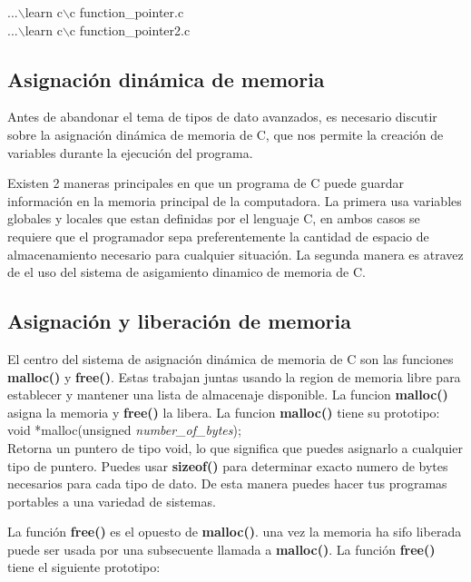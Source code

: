 \documentclass[]{article}
\begin{document}
	...$\backslash$learn c$\backslash$c function\_pointer.c\\
	
	...$\backslash$learn c$\backslash$c function\_pointer2.c\\
	
	\subsection{Asignación dinámica de memoria}
	
	Antes de abandonar el tema de tipos de dato avanzados, es necesario discutir sobre la asignación dinámica de memoria de C, que nos permite la creación de variables durante la ejecución del programa.
	
	Existen 2 maneras principales en que un programa de C puede guardar información en la memoria principal de la computadora. La primera usa variables globales y locales que estan definidas por el lenguaje C, en ambos casos se requiere que el programador sepa preferentemente la cantidad de espacio de almacenamiento necesario para cualquier situación. La segunda manera es atravez de el uso del sistema de asigamiento dinamico de memoria de C.\\
	
	\subsection{Asignación y liberación de memoria}
	
	El centro del sistema de asignación dinámica de memoria de C son las funciones \textbf{malloc()} y \textbf{free()}. Estas trabajan juntas usando la region de memoria libre para establecer y mantener una lista de almacenaje disponible. La funcion \textbf{malloc()} asigna la memoria y \textbf{free()} la libera. La funcion \textbf{malloc()} tiene su prototipo:\\
	
	void *malloc(unsigned \textit{number\_of\_bytes});\\
	
	Retorna un puntero de tipo void, lo que significa que puedes asignarlo a cualquier tipo de puntero. Puedes usar \textbf{sizeof()} para determinar exacto numero de bytes necesarios para cada tipo de dato. De esta manera puedes hacer tus programas portables a una variedad de sistemas.
	
	La función \textbf{free()} es el opuesto de \textbf{malloc()}. una vez la memoria ha sifo liberada puede ser usada por una subsecuente llamada a \textbf{malloc()}. La función \textbf{free()} tiene el siguiente prototipo:\\
	
\end{document}
